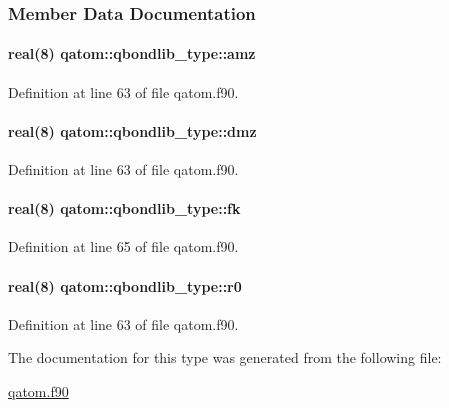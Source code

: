\subsubsection{Member Data Documentation}
\hypertarget{structqatom_1_1qbondlib__type_a21d052a158085f69d569d32c89677a06}{
\paragraph[{amz}]{\setlength{\rightskip}{0pt plus 5cm}real(8) qatom\-::qbondlib\-\_\-type\-::amz}}\label{structqatom_1_1qbondlib__type_a21d052a158085f69d569d32c89677a06}


Definition at line 63 of file qatom.\-f90.

\hypertarget{structqatom_1_1qbondlib__type_a9247734d230e83f66b0a479f0bc41e3c}{
\paragraph[{dmz}]{\setlength{\rightskip}{0pt plus 5cm}real(8) qatom\-::qbondlib\-\_\-type\-::dmz}}\label{structqatom_1_1qbondlib__type_a9247734d230e83f66b0a479f0bc41e3c}


Definition at line 63 of file qatom.\-f90.

\hypertarget{structqatom_1_1qbondlib__type_a8dfecaff6bb3224772bd7baeebefda96}{
\paragraph[{fk}]{\setlength{\rightskip}{0pt plus 5cm}real(8) qatom\-::qbondlib\-\_\-type\-::fk}}\label{structqatom_1_1qbondlib__type_a8dfecaff6bb3224772bd7baeebefda96}


Definition at line 65 of file qatom.\-f90.

\hypertarget{structqatom_1_1qbondlib__type_aba22d5e882d3d0f9335be97dc3a4ebe4}{
\paragraph[{r0}]{\setlength{\rightskip}{0pt plus 5cm}real(8) qatom\-::qbondlib\-\_\-type\-::r0}}\label{structqatom_1_1qbondlib__type_aba22d5e882d3d0f9335be97dc3a4ebe4}


Definition at line 63 of file qatom.\-f90.



The documentation for this type was generated from the following file\-:\begin{DoxyCompactItemize}
\item 
\hyperlink{qatom_8f90}{qatom.\-f90}\end{DoxyCompactItemize}
